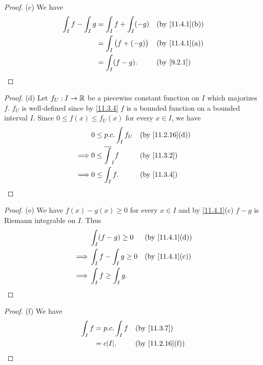 \begin{proof}{(c)}
  We have
  \begin{align*}
    \int_I f - \int_I g & = \int_I f + \int_I (-g)    &  & \by{11.4.1}[b] \\
                        & = \int_I \big(f + (-g)\big) &  & \by{11.4.1}[a] \\
                        & = \int_I (f - g).           &  & \by{9.2.1}
  \end{align*}
\end{proof}

\begin{proof}{(d)}
  Let \(f_U : I \to \mathbb{R}\) be a piecewise constant function on \(I\) which majorizes \(f\).
  \(f_U\) is well-defined since by \cref{11.3.4} \(f\) is a bounded function on a bounded interval \(I\).
  Since \(0 \leq f(x) \leq f_U(x)\) for every \(x \in I\), we have
  \begin{align*}
             & 0 \leq p.c. \int_I f_U     &  & \by{11.2.16}[d] \\
    \implies & 0 \leq \overline{\int}_I f &  & \by{11.3.2}     \\
    \implies & 0 \leq \int_I f.           &  & \by{11.3.4}
  \end{align*}
\end{proof}

\begin{proof}{(e)}
  We have \(f(x) - g(x) \geq 0\) for every \(x \in I\) and by \cref{11.4.1}(c) \(f - g\) is Riemann integrable on \(I\).
  Thus
  \begin{align*}
             & \int_I (f - g) \geq 0      &  & \by{11.4.1}[d] \\
    \implies & \int_I f - \int_I g \geq 0 &  & \by{11.4.1}[c] \\
    \implies & \int_I f \geq \int_I g.
  \end{align*}
\end{proof}

\begin{proof}{(f)}
  We have
  \begin{align*}
    \int_I f & = p.c. \int_I f &  & \by{11.3.7}     \\
             & = c \abs{I}.    &  & \by{11.2.16}[f]
  \end{align*}
\end{proof}

